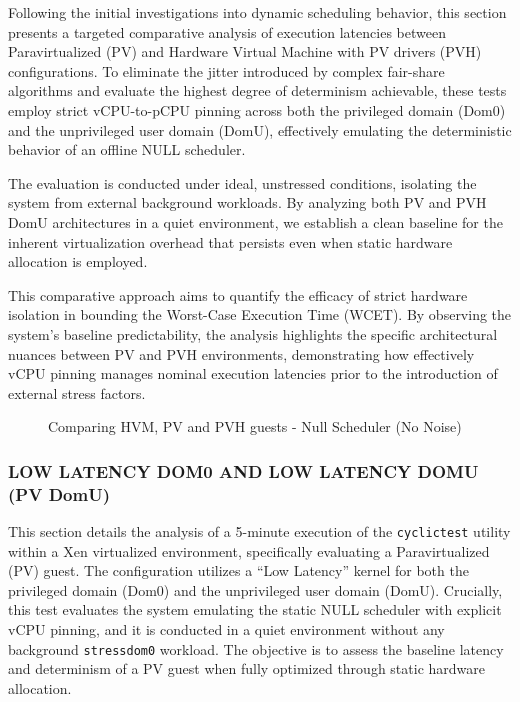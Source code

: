 Following the initial investigations into dynamic scheduling behavior,
this section presents a targeted comparative analysis of execution
latencies between Paravirtualized (PV) and Hardware Virtual Machine with
PV drivers (PVH) configurations. To eliminate the jitter introduced by
complex fair-share algorithms and evaluate the highest degree of
determinism achievable, these tests employ strict vCPU-to-pCPU pinning
across both the privileged domain (Dom0) and the unprivileged user
domain (DomU), effectively emulating the deterministic behavior of an
offline NULL scheduler.

The evaluation is conducted under ideal, unstressed conditions,
isolating the system from external background workloads. By analyzing
both PV and PVH DomU architectures in a quiet environment, we establish
a clean baseline for the inherent virtualization overhead that persists
even when static hardware allocation is employed.

This comparative approach aims to quantify the efficacy of strict
hardware isolation in bounding the Worst-Case Execution Time (WCET). By
observing the system's baseline predictability, the analysis highlights
the specific architectural nuances between PV and PVH environments,
demonstrating how effectively vCPU pinning manages nominal execution
latencies prior to the introduction of external stress factors.

\begin{figure}
\centering

\caption{Comparing HVM, PV and PVH guests - Null Scheduler (No Noise)}
\end{figure}

\subsubsection{LOW LATENCY DOM0 AND LOW LATENCY DOMU (PV
DomU)}\label{low-latency-dom0-and-low-latency-domu-pv-domu-2}

This section details the analysis of a 5-minute execution of the
\texttt{cyclictest} utility within a Xen virtualized environment,
specifically evaluating a Paravirtualized (PV) guest. The configuration
utilizes a ``Low Latency'' kernel for both the privileged domain (Dom0)
and the unprivileged user domain (DomU). Crucially, this test evaluates
the system emulating the static NULL scheduler with explicit vCPU
pinning, and it is conducted in a quiet environment without any
background \texttt{stressdom0} workload. The objective is to assess the
baseline latency and determinism of a PV guest when fully optimized
through static hardware allocation.

